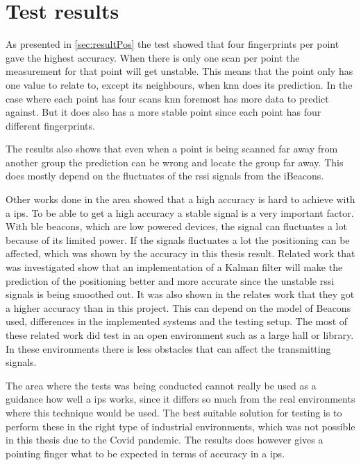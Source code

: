 \section{Test results}\label{sec:discussionResult}
As presented in \cref{sec:resultPos} the test showed that four fingerprints per point gave the highest accuracy.
When there is only one scan per point the measurement for that point will get unstable. 
This means that the point only has one value to relate to, except its neighbours, when \acrshort{knn} does its prediction.
In the case where each point has four scans \acrshort{knn} foremost has more data to predict against.
But it does also has a more stable point since each point has four different fingerprints.

The results also shows that even when a point is being scanned far away from another group the prediction can be wrong and locate the group far away.
This does mostly depend on the fluctuates of the \acrshort{rssi} signals from the iBeacons.

\bigskip

Other works done in the area showed that a high accuracy is hard to achieve with a \acrshort{ips}.
To be able to get a high accuracy a stable signal is a very important factor.
With \acrshort{ble} beacons, which are low powered devices, the signal can fluctuates a lot because of its limited power.
If the signals fluctuates a lot the positioning can be affected, which was shown by the accuracy in this thesis result.
Related work that was investigated show that an implementation of a Kalman filter will make the prediction of the positioning better and more accurate since the unstable \acrshort{rssi} signals is being smoothed out.
It was also shown in the relates work that they got a higher accuracy than in this project.
This can depend on the model of Beacons used, differences in the implemented systems and the testing setup.
The most of these related work did test in an open environment such as a large hall or library.
In these environments there is less obstacles that can affect the transmitting signals.

\bigskip

The area where the tests was being conducted cannot really be used as a guidance how well a \acrshort{ips} works, since it differs so much from the real environments where this technique would be used.
The best suitable solution for testing is to perform these in the right type of industrial environments, which was not possible in this thesis due to the Covid pandemic.
The results does however gives a pointing finger what to be expected in terms of accuracy in a \acrshort{ips}.


